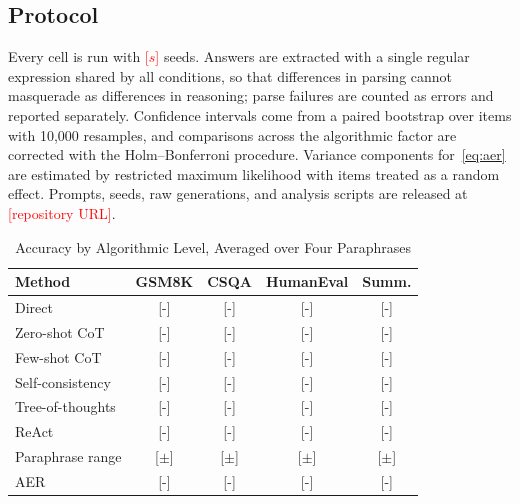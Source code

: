 \documentclass[conference]{IEEEtran}
\begin{document}
\subsection{Protocol}
\label{sec:protocol}

Every cell is run with \textcolor{red}{[$s$]} seeds. Answers are extracted with a single regular expression shared by all conditions, so that differences in parsing cannot masquerade as differences in reasoning; parse failures are counted as errors and reported separately. Confidence intervals come from a paired bootstrap over items with 10,000 resamples, and comparisons across the algorithmic factor are corrected with the Holm--Bonferroni procedure. Variance components for~\eqref{eq:aer} are estimated by restricted maximum likelihood with items treated as a random effect. Prompts, seeds, raw generations, and analysis scripts are released at \textcolor{red}{[repository URL]}.

\begin{table}[htbp]
\caption{Accuracy by Algorithmic Level, Averaged over Four Paraphrases}
\centering
\small
\begin{tabular}{lcccc}
\toprule
\textbf{Method} & \textbf{GSM8K} & \textbf{CSQA} & \textbf{HumanEval} & \textbf{Summ.} \\
\midrule
Direct & \textcolor{BrickRed}{[-]} & \textcolor{BrickRed}{[-]} & \textcolor{BrickRed}{[-]} & \textcolor{BrickRed}{[-]} \\
Zero-shot CoT & \textcolor{BrickRed}{[-]} & \textcolor{BrickRed}{[-]} & \textcolor{BrickRed}{[-]} & \textcolor{BrickRed}{[-]} \\
Few-shot CoT & \textcolor{BrickRed}{[-]} & \textcolor{BrickRed}{[-]} & \textcolor{BrickRed}{[-]} & \textcolor{BrickRed}{[-]} \\
Self-consistency & \textcolor{BrickRed}{[-]} & \textcolor{BrickRed}{[-]} & \textcolor{BrickRed}{[-]} & \textcolor{BrickRed}{[-]} \\
Tree-of-thoughts & \textcolor{BrickRed}{[-]} & \textcolor{BrickRed}{[-]} & \textcolor{BrickRed}{[-]} & \textcolor{BrickRed}{[-]} \\
ReAct & \textcolor{BrickRed}{[-]} & \textcolor{BrickRed}{[-]} & \textcolor{BrickRed}{[-]} & \textcolor{BrickRed}{[-]} \\
\midrule
Paraphrase range & \textcolor{BrickRed}{[$\pm$]} & \textcolor{BrickRed}{[$\pm$]} & \textcolor{BrickRed}{[$\pm$]} & \textcolor{BrickRed}{[$\pm$]} \\
AER & \textcolor{BrickRed}{[-]} & \textcolor{BrickRed}{[-]} & \textcolor{BrickRed}{[-]} & \textcolor{BrickRed}{[-]} \\
\bottomrule
\end{tabular}
\label{tab:accuracy}
\end{table}
\end{document}
